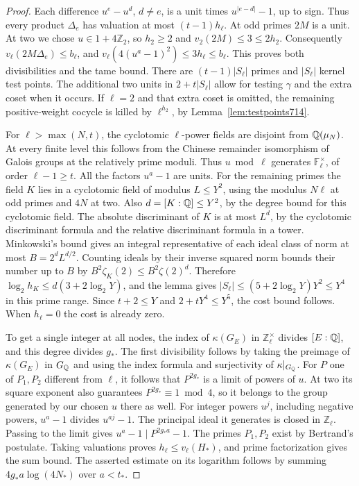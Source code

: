\documentclass[a4paper,11pt]{article}
\theoremstyle{definition}
\theoremstyle{remark}
\newcommand{\ZZ}{\mathbb Z}\newcommand{\ord}{\operatorname{ord}}
\numberwithin{equation}{section}
\begin{document}
\begin{proof}
Each difference \(u^e-u^d\), \(d\ne e\), is a unit times
\(u^{|e-d|}-1\), up to sign. Thus every product \(\Delta_e\)
has valuation at most \((t-1)h_\ell\). At odd primes \(2M\)
is a unit. At two we chose \(u\in1+4\ZZ_2\), so \(h_2\ge2\)
and \(v_2(2M)\le3\le2h_2\). Consequently
\(v_\ell(2M\Delta_e)\le b_\ell\), and
\(v_\ell(4(u^a-1)^2)\le3h_\ell\le b_\ell\).
This proves both divisibilities and the tame bound. There are
\((t-1)|S_\ell|\) primes and \(|S_\ell|\) kernel test points.
The additional two units in \(2+t|S_\ell|\) allow for testing
\(\gamma\) and the extra coset when it occurs. If \(\ell=2\)
and that extra coset is omitted, the remaining positive-weight
cocycle is killed by \(\ell^{h_2}\), by
Lemma~\ref{lem:testpoints714}.

For \(\ell>\max(N,t)\), the cyclotomic \(\ell\)-power fields
are disjoint from \(\mathbb Q(\mu_N)\). At every finite level this
follows from the Chinese remainder isomorphism of Galois groups
at the relatively prime moduli. Thus \(u\bmod\ell\) generates
\(\mathbb F_\ell^\times\), of order \(\ell-1\ge t\). All the
factors \(u^a-1\) are units. For the remaining primes the
field \(K\) lies in a cyclotomic field of modulus \(L\le Y^2\),
using the modulus \(N\ell\) at odd primes and \(4N\) at two.
Also \(d=[K:\mathbb Q]\le Y^2\), by the degree bound for this
cyclotomic field. The absolute discriminant of \(K\) is at
most \(L^d\), by the cyclotomic discriminant formula and
the relative discriminant formula in a tower. Minkowski's
bound gives an integral representative of each ideal class
of norm at most \(B=2^d L^{d/2}\). Counting ideals by their
inverse squared norm bounds their number up to \(B\) by
\(B^2\zeta_K(2)\le B^2\zeta(2)^d\). Therefore
\(\log_2 h_K\le d(3+2\log_2Y)\), and the lemma gives
\(|S_\ell|\le(5+2\log_2Y)Y^2\le Y^4\) in this prime range.
Since \(t+2\le Y\) and \(2+tY^4\le Y^5\), the cost bound
follows. When \(h_\ell=0\) the cost is already zero.

To get a single integer at all nodes, the index of
\(\kappa(G_E)\) in \(\ZZ_\ell^\times\) divides
\([E:\mathbb Q]\), and this degree divides \(g_*\). The first
divisibility follows by taking the preimage of \(\kappa(G_E)\)
in \(G_\mathbb Q\) and using the index formula and surjectivity of
\(\kappa|_{G_\mathbb Q}\). For \(P\) one of \(P_1,P_2\) different
from \(\ell\), it follows that \(P^{2g_*}\) is a limit of
powers of \(u\). At two its square exponent also guarantees
\(P^{2g_*}\equiv1\bmod4\), so it belongs to the group generated
by our chosen \(u\) there as well. For integer powers \(u^j\),
including negative powers, \(u^a-1\) divides \(u^{aj}-1\).
The principal ideal it generates is closed in \(\ZZ_\ell\).
Passing to the limit gives \(u^a-1\mid P^{2g_*a}-1\).
The primes \(P_1,P_2\) exist by Bertrand's postulate. Taking
valuations proves \(h_\ell\le v_\ell(H_*)\), and prime
factorization gives the sum bound. The asserted estimate
on its logarithm follows by summing
\(4g_*a\log(4N_*)\) over \(a<t_*\).
\end{proof}
\end{document}
